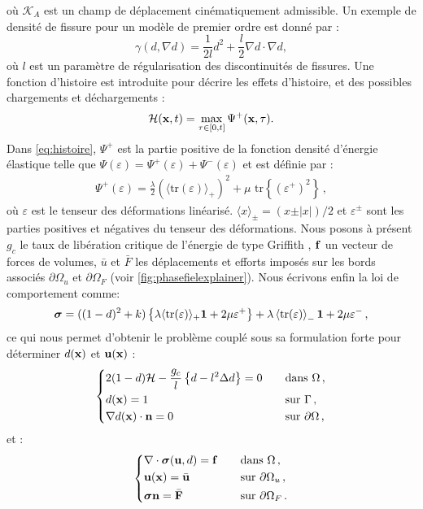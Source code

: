 où $\mathcal{K}_A$ est un champ de déplacement cinématiquement admissible. Un exemple de densité de fissure pour un modèle de premier ordre est donné par :
$$
\gamma (d, \nabla d) = \frac{1}{2l}d^2 + \frac{l}{2}\nabla d \cdot \nabla d,
$$
où $l$ est un paramètre de régularisation des discontinuités de fissures. Une fonction d'histoire est introduite pour décrire les effets d'histoire, et des possibles chargements et déchargements \parencite{miehe2010phase}:
\begin{align}
    \label{eq:histoire}
    \mathcal{H}(\bm{\mathrm{x}}, t) = \max_{\tau \in [0,t]} \Psi^{+}(\bm{\mathrm{x}},\tau) .
\end{align}
Dans \cref{eq:histoire}, $\Psi^+$ est la partie positive de la fonction densité d’énergie élastique telle que $\Psi(\varepsilon) = \Psi^{+}(\varepsilon) + \Psi^{-}(\varepsilon)$
et est définie par :
\begin{align}
    \Psi^{+}(\varepsilon) = \frac{\lambda}{2}(\langle  \text{tr}(\varepsilon) \rangle_{+})^2 + \mu \text{ tr} \left\{ (\varepsilon^{+})^2 \right\} \,,
\end{align}
où $\varepsilon$ est le tenseur des déformations linéarisé. $\langle x\rangle_{\pm} = (x \pm \vert x \vert) / 2$ et $\varepsilon^{\pm}$ sont les parties positives et négatives du tenseur des déformations. Nous posons à présent $g_c$ le taux de libération critique de l'énergie de type Griffith \parencite[p.5]{miehe2010phase}, $\bm{\mathrm{f}}$ un vecteur de forces de volumes, $\bar{u}$ et $\bar{F}$ les déplacements et efforts imposés sur les bords associés $\partial \Omega_u$ et $\partial \Omega_F$ (voir \cref{fig:phasefielexplainer}). Nous écrivons enfin la loi de comportement comme:
\begin{align}
    \bm{\mathrm{\sigma}} = ((1-d)^2 + k)\left\{ \lambda \langle \text{tr}(\varepsilon) \rangle_{+} \bm{\mathrm{1}} + 2\mu \varepsilon^{+}  \right\} + \lambda \left\langle \text{tr}(\varepsilon) \right\rangle_{-} \bm{\mathrm{1}} + 2\mu \varepsilon^{-} \,,
\end{align}
ce qui nous permet d'obtenir le problème couplé sous sa formulation forte pour déterminer $d(\bm{\mathrm{x}})$ et $\bm{\mathrm{u}}(\bm{\mathrm{x}})$ :
\begin{align}
    \begin{dcases}
        2(1-d)\mathcal{H} - \frac{g_c}{l} \left\{ d-l^2 \Delta d \right\} = 0      &\quad \text{dans } \Omega \,, \\
        d(\bm{\mathrm{x}}) = 1   &\quad \text{sur } \Gamma \,, \\
        \nabla d(\bm{\mathrm{x}}) \cdot \bm{\mathrm{n}} = 0   &\quad \text{sur } \partial \Omega \,,
    \end{dcases}
\end{align}
et :
\begin{align}
    \begin{dcases}
        \nabla \cdot \bm{\mathrm{\sigma}}(\bm{\mathrm{u}},d) = \bm{\mathrm{f}} &\quad \text{dans } \Omega \,, \\
        \bm{\mathrm{u}}(\bm{\mathrm{x}}) = \bar{\bm{\mathrm{u}}} &\quad \text{sur } \partial \Omega_u \,, \\
        \bm{\mathrm{\sigma}} \bm{\mathrm{n}} = \bar{\bm{\mathrm{F}}} &\quad \text{sur } \partial \Omega_F \,.
    \end{dcases}
\end{align}

